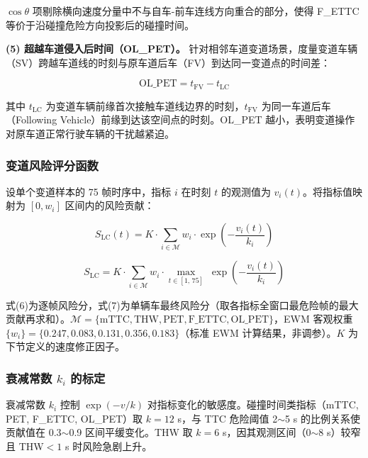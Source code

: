 \documentclass[preprint,review,12pt,a4paper]{elsarticle}
\begin{document}
$\cos\theta$ 项剔除横向速度分量中不与自车-前车连线方向重合的部分，使得 F\_ETTC 等价于沿碰撞危险方向投影后的碰撞时间。

\textbf{(5) 超越车道侵入后时间（OL\_PET）。} 针对相邻车道变道场景，度量变道车辆（SV）跨越车道线的时刻与原车道后车（FV）到达同一变道点的时间差：

\begin{equation}
\text{OL\_PET} = t_{\text{FV}} - t_{\text{LC}}
\end{equation}

其中 $t_{\text{LC}}$ 为变道车辆前缘首次接触车道线边界的时刻，$t_{\text{FV}}$ 为同一车道后车（Following Vehicle）前缘到达该空间点的时刻。OL\_PET 越小，表明变道操作对原车道正常行驶车辆的干扰越紧迫。

\subsubsection{变道风险评分函数}

设单个变道样本的 75 帧时序中，指标 $i$ 在时刻 $t$ 的观测值为 $v_i(t)$。将指标值映射为 $[0, w_i]$ 区间内的风险贡献：

\begin{equation}
S_{\text{LC}}(t) = K \cdot \sum_{i \in \mathcal{M}} w_i \cdot \exp\!\left(-\frac{v_i(t)}{k_i}\right)
\end{equation}

\begin{equation}
S_{\text{LC}} = K \cdot \sum_{i \in \mathcal{M}} w_i \cdot \max_{t \in [1,\,75]}\;\exp\!\left(-\frac{v_i(t)}{k_i}\right)
\end{equation}

式(6)为逐帧风险分，式(7)为单辆车最终风险分（取各指标全窗口最危险帧的最大贡献再求和）。$\mathcal{M} = \{\text{mTTC}, \text{THW}, \text{PET}, \text{F\_ETTC}, \text{OL\_PET}\}$，EWM 客观权重 $\{w_i\} = \{0.247, 0.083, 0.131, 0.356, 0.183\}$（标准 EWM 计算结果，非调参）。$K$ 为下节定义的速度修正因子。

\subsubsection{衰减常数 $k_i$ 的标定}

衰减常数 $k_i$ 控制 $\exp(-v/k)$ 对指标变化的敏感度。碰撞时间类指标（mTTC, PET, F\_ETTC, OL\_PET）取 $k=12$ s，与 TTC 危险阈值 2$\sim$5 s\cite{C06} 的比例关系使贡献值在 0.3$\sim$0.9 区间平缓变化。THW 取 $k=6$ s，因其观测区间（0$\sim$8 s）较窄且 THW$<1$ s 时风险急剧上升\cite{C18}。
\end{document}
